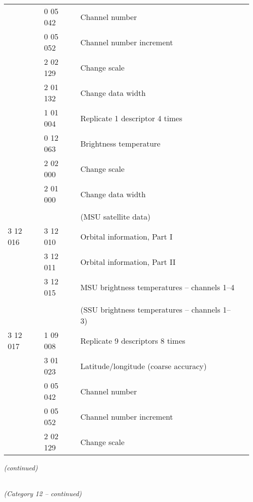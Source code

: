 \begin{longtable}[]{@{}llll@{}}
& 0 05 042 & Channel number &\tabularnewline
& 0 05 052 & Channel number increment &\tabularnewline
& 2 02 129 & Change scale &\tabularnewline
& 2 01 132 & Change data width &\tabularnewline
& 1 01 004 & Replicate 1 descriptor 4 times &\tabularnewline
& 0 12 063 & Brightness temperature &\tabularnewline
& 2 02 000 & Change scale &\tabularnewline
& 2 01 000 & Change data width &\tabularnewline
& & &\tabularnewline
& & (MSU satellite data) &\tabularnewline
3 12 016 & 3 12 010 & Orbital information, Part I &\tabularnewline
& 3 12 011 & Orbital information, Part II &\tabularnewline
& 3 12 015 & MSU brightness temperatures -- channels 1--4 &\tabularnewline
& & &\tabularnewline
& & (SSU brightness temperatures -- channels 1--3) &\tabularnewline
3 12 017 & 1 09 008 & Replicate 9 descriptors 8 times &\tabularnewline
& 3 01 023 & Latitude/longitude (coarse accuracy) &\tabularnewline
& 0 05 042 & Channel number &\tabularnewline
& 0 05 052 & Channel number increment &\tabularnewline
& 2 02 129 & Change scale &\tabularnewline
\bottomrule
\end{longtable}

\emph{(continued)}

\emph{\\
(Category 12 -- continued)}

